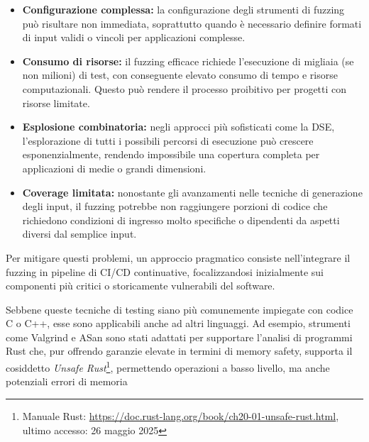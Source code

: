 \begin{itemize}
  \item \textbf{Configurazione complessa:} la configurazione degli strumenti di
    fuzzing può risultare non immediata, soprattutto quando è necessario definire
    formati di input validi o vincoli per applicazioni complesse.

  \item \textbf{Consumo di risorse:} il fuzzing efficace richiede l'esecuzione
    di migliaia (se non milioni) di test, con conseguente elevato consumo di tempo
    e risorse computazionali. Questo può rendere il processo proibitivo per
    progetti con risorse limitate.

  \item \textbf{Esplosione combinatoria:} negli approcci più sofisticati come la
    DSE, l'esplorazione di tutti i possibili percorsi di esecuzione può crescere
    esponenzialmente, rendendo impossibile una copertura completa per
    applicazioni di medie o grandi dimensioni.

  \item \textbf{Coverage limitata:} nonostante gli avanzamenti nelle tecniche di
    generazione degli input, il fuzzing potrebbe non raggiungere porzioni di codice
    che richiedono condizioni di ingresso molto specifiche o dipendenti da aspetti
    diversi dal semplice input.
\end{itemize}

Per mitigare questi problemi, un approccio pragmatico consiste nell'integrare il
fuzzing in pipeline di CI/CD continuative, focalizzandosi inizialmente sui componenti
più critici o storicamente vulnerabili del software.

\bigskip
\noindent
Sebbene queste tecniche di testing siano più comunemente impiegate con codice C o
C++, esse sono applicabili anche ad altri linguaggi. Ad esempio, strumenti come
Valgrind e ASan sono stati adattati per supportare l'analisi di programmi Rust\cite{valgrind_rust}\cite{rust_manual_san}
che, pur offrendo garanzie elevate in termini di memory safety, supporta il
cosiddetto \textit{Unsafe Rust}\footnote{Manuale Rust: \url{https://doc.rust-lang.org/book/ch20-01-unsafe-rust.html},
ultimo accesso: 26 maggio 2025}, permettendo operazioni a basso livello, ma
anche potenziali errori di memoria